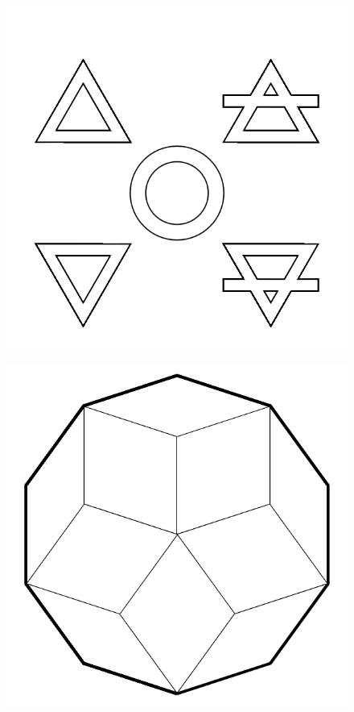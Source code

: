 \documentclass[17pt]{extreport}
\begin{document}
	\begin{figure}
		\centering
		\includegraphics[width=6.25in]{imageserver/uploadimages/image6.png}
	\end{figure}
	
	\begin{figure}
		\centering
		\includegraphics[width=6.25in]{imageserver/uploadimages/image7.png}
	\end{figure}
	
\end{document}
